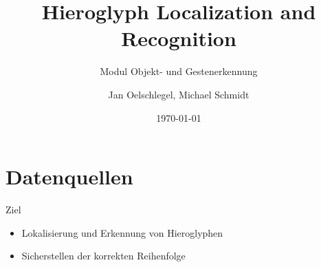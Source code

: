 \documentclass[hyperref={pdfpagelabels=false}]{beamer}
\title {Hieroglyph Localization and Recognition}
\subtitle{Modul Objekt- und Gestenerkennung}
\author {Jan Oelschlegel, Michael Schmidt}
\institute{HTWK Leipzig, Fakultät IM}
\date{\today}
\begin{document}
\maketitle


\section{Datenquellen}

\begin{frame}{Ziel}
	\begin{itemize}
		\item Lokalisierung und Erkennung von Hieroglyphen
		\item Sicherstellen der korrekten Reihenfolge
	\end{itemize}



\end{frame}
\end{document}
